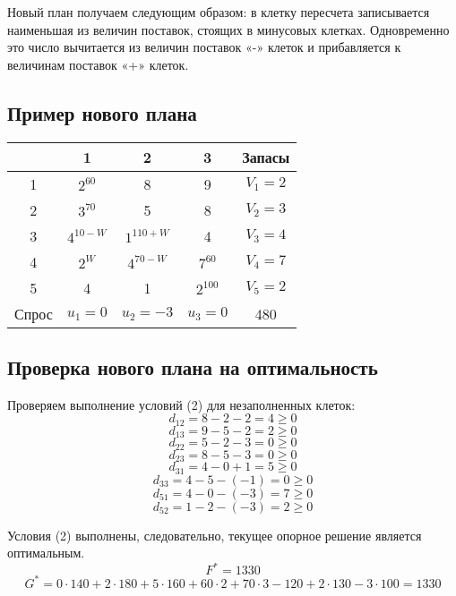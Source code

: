 \documentclass[17pt]{extarticle}
\begin{document}
Новый план получаем следующим образом: в клетку пересчета записывается наименьшая из величин поставок, стоящих в минусовых клетках. Одновременно это число вычитается из величин поставок «-» клеток и прибавляется к величинам поставок «+» клеток.

\subsection{Пример нового плана}

\begin{longtable}{|c|c|c|c|c|}
    \hline
          & 1              & 2               & 3             & Запасы        \\
    \hline
    1     & $2^{60}$       & 8               & 9             & \( V_1 = 2 \) \\
    \hline
    2     & $3^{70}$       & 5               & 8             & \( V_2 = 3 \) \\
    \hline
    3     & \( 4^{10-W} \) & \( 1^{110+W} \) & 4             & \( V_3 = 4 \) \\
    \hline
    4     & \( 2^W \)      & \( 4^{70-W} \)  & $7^{60}$      & \( V_4 = 7 \) \\
    \hline
    5     & 4              & 1               & $2^{100}$     & \( V_5 = 2 \) \\
    \hline
    Спрос & \( u_1 = 0 \)  & \( u_2 = -3 \)  & \( u_3 = 0 \) & 480           \\
    \hline
\end{longtable}

\subsection{Проверка нового плана на оптимальность}
Проверяем выполнение условий (2) для незаполненных клеток:
\[
    d_{12} = 8 - 2 - 2 = 4 \geq 0
\]
\[
    d_{13} = 9 - 5 - 2 = 2 \geq 0
\]
\[
    d_{22} = 5 - 2 - 3 = 0 \geq 0
\]
\[
    d_{23} = 8 - 5 - 3 = 0 \geq 0
\]
\[
    d_{31} = 4 - 0 + 1 = 5 \geq 0
\]
\[
    d_{33} = 4 - 5 - (-1) = 0 \geq 0
\]
\[
    d_{51} = 4 - 0 - (-3) = 7 \geq 0
\]
\[
    d_{52} = 1 - 2 - (-3) = 2 \geq 0
\]

Условия (2) выполнены, следовательно, текущее опорное решение является оптимальным.
\[
    F^* = 1330
\]
\[
    G^* = 0 \cdot 140 + 2 \cdot 180 + 5 \cdot 160 + 60 \cdot 2 + 70 \cdot 3 - 120 + 2 \cdot 130 - 3 \cdot 100 = 1330
\]
\end{document}
